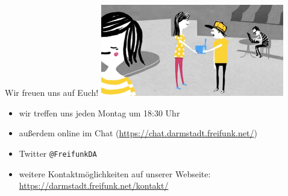 \documentclass[10pt]{beamer}
\begin{document}
  \begin{frame}{Wir freuen uns auf Euch!}
    \hspace{1em}\includegraphics[width=0.6\textwidth]{images/router}
    \begin{itemize}
      \item wir treffen uns jeden Montag um 18:30 Uhr
      \item außerdem online im Chat (\url{https://chat.darmstadt.freifunk.net/})
      \item Twitter \texttt{@FreifunkDA}
      \item weitere Kontaktmöglichkeiten auf unserer Webseite:\\
      \url{https://darmstadt.freifunk.net/kontakt/}
    \end{itemize}
  \end{frame}
\end{document}
